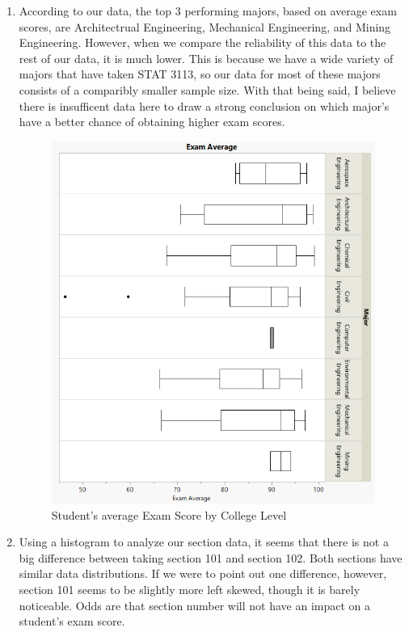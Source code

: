 \documentclass[14pt]{article}
\begin{document}
\begin{enumerate}
\pagebreak

\item
According to our data, the top 3 performing majors, based on average exam scores, are Architectrual Engineering, Mechanical Engineering, and Mining Engineering. However, when we compare the reliability of this data to the rest of our data, it is much lower. This is because we have a wide variety of majors that have taken STAT 3113, so our data for most of these majors consists of a comparibly smaller sample size. With that being said, I believe there is insufficent data here to draw a strong conclusion on which major's have a better chance of obtaining higher exam scores.

\vspace{2em}

\begin{figure}[h]
\caption*{Student's average Exam Score by College Level}
\centering
\includegraphics[scale=0.75]{exam1/5.png}
\end{figure}

\pagebreak

\item
Using a histogram to analyze our section data, it seems that there is not a big difference between taking section 101 and section 102. Both sections have similar data distributions. If we were to point out one difference, however, section 101 seems to be slightly more left skewed, though it is barely noticeable. Odds are that section number will not have an impact on a  student's exam score.


\end{enumerate}
\end{document}
